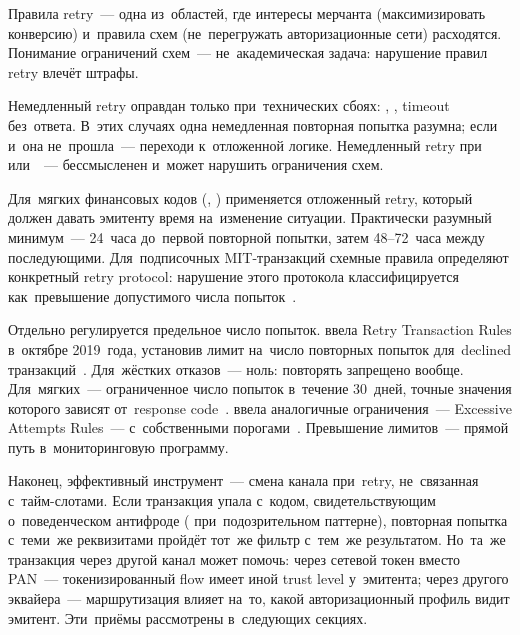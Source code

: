 Правила retry~--- одна из~областей, где интересы мерчанта (максимизировать
конверсию) и~правила схем (не~перегружать авторизационные сети) расходятся.
Понимание ограничений схем~--- не~академическая задача: нарушение правил
retry влечёт штрафы.

Немедленный retry оправдан только при~технических сбоях: ,
, timeout без~ответа. В~этих случаях одна немедленная повторная
попытка разумна; если и~она не~прошла~--- переходи к~отложенной логике.
Немедленный retry при~ или~~--- бессмысленен и~может
нарушить ограничения схем.

Для~мягких финансовых кодов (, ) применяется отложенный retry,
который должен давать эмитенту время на~изменение ситуации. Практически разумный
минимум~--- 24~часа до~первой повторной попытки, затем 48--72~часа между
последующими. Для~подписочных MIT-транзакций схемные правила определяют
конкретный retry protocol: нарушение этого протокола классифицируется
как~превышение допустимого числа попыток~.

Отдельно регулируется предельное число попыток.  ввела Retry Transaction
Rules в~октябре 2019~года, установив лимит на~число повторных попыток
для~declined транзакций~. Для~жёстких
отказов~--- ноль: повторять запрещено вообще. Для~мягких~--- ограниченное
число попыток в~течение 30~дней, точные значения которого зависят от~response
code~.
 ввела аналогичные ограничения~--- Excessive Attempts
Rules~--- с~собственными порогами~. Превышение
лимитов~--- прямой путь в~мониторинговую программу.

Наконец, эффективный инструмент~--- смена канала при~retry, не~связанная
с~тайм-слотами. Если транзакция упала с~кодом, свидетельствующим о~поведенческом
антифроде ( при~подозрительном паттерне), повторная попытка с~теми~же
реквизитами пройдёт тот~же фильтр с~тем~же результатом. Но~та~же транзакция
через другой канал может помочь: через сетевой токен вместо PAN~---
токенизированный flow имеет иной trust level у~эмитента; через другого
эквайера~--- маршрутизация влияет на~то, какой авторизационный профиль
видит эмитент. Эти~приёмы рассмотрены в~следующих секциях.



